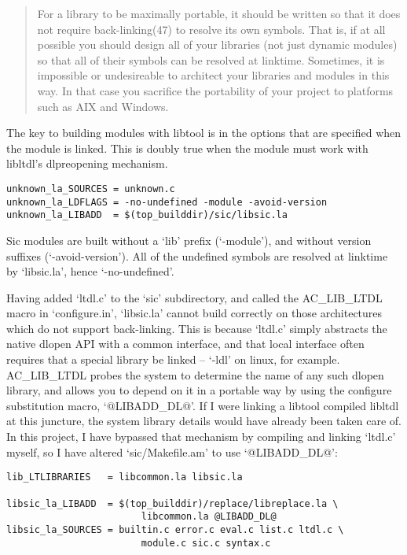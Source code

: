 \begin{quote}
    For a library to be maximally portable, it should be written so that it does not require back-linking(47) to resolve its own symbols. That is, if at all possible you should design all of your libraries (not just dynamic modules) so that all of their symbols can be resolved at linktime. Sometimes, it is impossible or undesireable to architect your libraries and modules in this way. In that case you sacrifice the portability of your project to platforms such as AIX and Windows. 
\end{quote}

The key to building modules with libtool is in the options that are specified when the module is linked. This is doubly true when the module must work with libltdl's dlpreopening mechanism. 
 	
\begin{Verbatim}[frame=single]
unknown_la_SOURCES = unknown.c
unknown_la_LDFLAGS = -no-undefined -module -avoid-version
unknown_la_LIBADD  = $(top_builddir)/sic/libsic.la
\end{Verbatim}

Sic modules are built without a `lib' prefix (`-module'), and without version suffixes (`-avoid-version'). All of the undefined symbols are resolved at linktime by `libsic.la', hence `-no-undefined'.

Having added `ltdl.c' to the `sic' subdirectory, and called the AC\_{}LIB\_{}LTDL macro in `configure.in', `libsic.la' cannot build correctly on those architectures which do not support back-linking. This is because `ltdl.c' simply abstracts the native dlopen API with a common interface, and that local interface often requires that a special library be linked -- `-ldl' on linux, for example. AC\_{}LIB\_{}LTDL probes the system to determine the name of any such dlopen library, and allows you to depend on it in a portable way by using the configure substitution macro, `@LIBADD\_{}DL@'. If I were linking a libtool compiled libltdl at this juncture, the system library details would have already been taken care of. In this project, I have bypassed that mechanism by compiling and linking `ltdl.c' myself, so I have altered `sic/Makefile.am' to use `@LIBADD\_{}DL@': 
 	
\begin{Verbatim}[frame=single]
lib_LTLIBRARIES   = libcommon.la libsic.la

libsic_la_LIBADD  = $(top_builddir)/replace/libreplace.la \
                        libcommon.la @LIBADD_DL@
libsic_la_SOURCES = builtin.c error.c eval.c list.c ltdl.c \
                        module.c sic.c syntax.c
\end{Verbatim}

